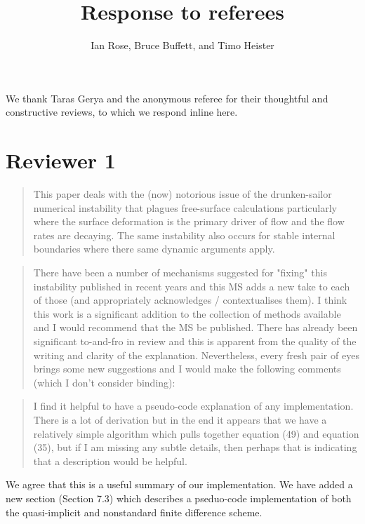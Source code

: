 \documentclass[a4paper,12pt]{article}
\title{Response to referees}
\author{Ian Rose, Bruce Buffett, and Timo Heister}
\date{}
\begin{document}
\maketitle

We thank Taras Gerya and the anonymous referee for their thoughtful and constructive reviews,
to which we respond inline here.

\section*{ Reviewer 1}

\begin{quotation}
  This paper deals with the (now) notorious issue of the drunken-sailor numerical instability that plagues free-surface calculations particularly where the surface deformation is the primary driver of flow and the flow rates are decaying. The same instability also occurs for stable internal boundaries where there same dynamic arguments apply.
\end{quotation}

\begin{quotation}
There have been a number of mechanisms suggested for "fixing" this instability published in recent years and this MS adds a new take to each of those (and appropriately acknowledges / contextualises them). I think this work is a significant addition to the collection of methods available and I would recommend that the MS be published. There has already been significant to-and-fro in review and this is apparent from the quality of the writing and clarity of the explanation. Nevertheless, every fresh pair of eyes brings some new suggestions and I would make the following comments (which I don't consider binding):
\end{quotation}



\begin{quotation}
I find it helpful to have a pseudo-code explanation of any implementation. There is a lot of derivation but in the end it appears that we have a relatively simple algorithm which pulls together equation (49) and equation (35), but if I am missing any subtle details, then perhaps that is indicating that a description would be helpful.
\end{quotation}

We agree that this is a useful summary of our implementation.
We have added a new section (Section 7.3) which describes a pseduo-code implementation
of both the quasi-implicit and nonstandard finite difference scheme.
\end{document}
